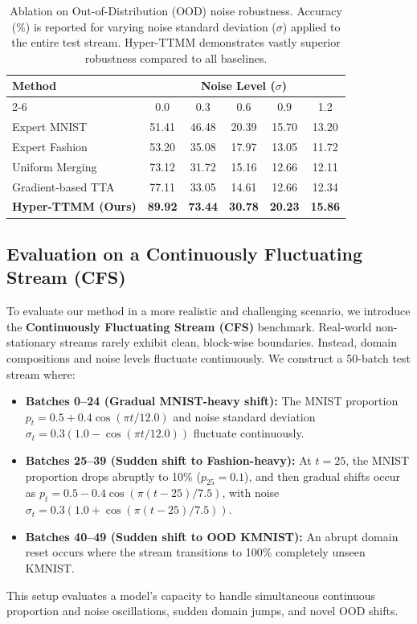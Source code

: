 \documentclass{article}
\theoremstyle{plain}
\theoremstyle{definition}
\theoremstyle{remark}
\begin{document}
\begin{table}[hbtp]
\caption{Ablation on Out-of-Distribution (OOD) noise robustness. Accuracy (\%) is reported for varying noise standard deviation ($\sigma$) applied to the entire test stream. Hyper-TTMM demonstrates vastly superior robustness compared to all baselines.}
\label{tab:ablation_noise}
\vskip 0.15in
\begin{center}
\begin{small}
\begin{sc}
\setlength{\tabcolsep}{1.8pt}
\begin{tabular}{lccccc}
\toprule
\multirow{2}{*}{Method} & \multicolumn{5}{c}{Noise Level ($\sigma$)} \\
\cmidrule(lr){2-6}
& 0.0 & 0.3 & 0.6 & 0.9 & 1.2 \\
\midrule
Expert MNIST & 51.41 & 46.48 & 20.39 & 15.70 & 13.20 \\
Expert Fashion & 53.20 & 35.08 & 17.97 & 13.05 & 11.72 \\
Uniform Merging & 73.12 & 31.72 & 15.16 & 12.66 & 12.11 \\
Gradient-based TTA & 77.11 & 33.05 & 14.61 & 12.66 & 12.34 \\
\midrule
\textbf{Hyper-TTMM (Ours)} & \textbf{89.92} & \textbf{73.44} & \textbf{30.78} & \textbf{20.23} & \textbf{15.86} \\
\bottomrule
\end{tabular}
\end{sc}
\end{small}
\end{center}
\vskip -0.1in
\end{table}

\subsection{Evaluation on a Continuously Fluctuating Stream (CFS)}
\label{sec:cfs-eval}
To evaluate our method in a more realistic and challenging scenario, we introduce the \textbf{Continuously Fluctuating Stream (CFS)} benchmark. Real-world non-stationary streams rarely exhibit clean, block-wise boundaries. Instead, domain compositions and noise levels fluctuate continuously. We construct a 50-batch test stream where:
\begin{itemize}
    \item \textbf{Batches 0--24 (Gradual MNIST-heavy shift):} The MNIST proportion $p_t = 0.5 + 0.4 \cos(\pi t / 12.0)$ and noise standard deviation $\sigma_t = 0.3 (1.0 - \cos(\pi t / 12.0))$ fluctuate continuously.
    \item \textbf{Batches 25--39 (Sudden shift to Fashion-heavy):} At $t=25$, the MNIST proportion drops abruptly to 10\% ($p_{25}=0.1$), and then gradual shifts occur as $p_t = 0.5 - 0.4 \cos(\pi (t-25) / 7.5)$, with noise $\sigma_t = 0.3 (1.0 + \cos(\pi (t-25) / 7.5))$.
    \item \textbf{Batches 40--49 (Sudden shift to OOD KMNIST):} An abrupt domain reset occurs where the stream transitions to 100\% completely unseen KMNIST.
\end{itemize}
This setup evaluates a model's capacity to handle simultaneous continuous proportion and noise oscillations, sudden domain jumps, and novel OOD shifts.
\end{document}
